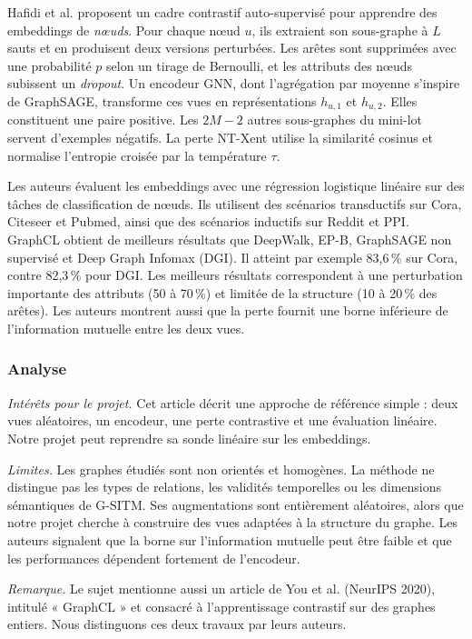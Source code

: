 \documentclass[11pt, french, screen, research-development]{report-rd-info}
\begin{document}
 Hafidi et al. \cite{hafidi2020graphcl} proposent un cadre contrastif auto-supervisé pour apprendre
des embeddings de \emph{nœuds}.
 Pour chaque nœud $u$, ils extraient son sous-graphe à $L$ sauts et en produisent deux versions
perturbées.
 Les arêtes sont supprimées avec une probabilité $p$ selon un tirage de Bernoulli, et les attributs
des nœuds subissent un \emph{dropout}.
 Un encodeur GNN, dont l'agrégation par moyenne s'inspire de GraphSAGE, transforme ces vues en
représentations $h_{u,1}$ et $h_{u,2}$.
 Elles constituent une paire positive. Les $2M-2$ autres sous-graphes du mini-lot servent d'exemples
négatifs.
 La perte NT-Xent utilise la similarité cosinus et normalise l'entropie croisée par la température
$\tau$.

 Les auteurs évaluent les embeddings avec une régression logistique linéaire sur des tâches de
classification de nœuds.
 Ils utilisent des scénarios transductifs sur Cora, Citeseer et Pubmed, ainsi que des scénarios
inductifs sur Reddit et PPI.
 GraphCL obtient de meilleurs résultats que DeepWalk, EP-B, GraphSAGE non supervisé et Deep Graph
Infomax (DGI).
Il atteint par exemple 83{,}6\,\% sur Cora, contre 82{,}3\,\% pour DGI. 
 Les meilleurs résultats correspondent à une perturbation importante des attributs (50 à 70\,\%) et
limitée de la structure (10 à 20\,\% des arêtes).
 Les auteurs montrent aussi que la perte fournit une borne inférieure de l'information mutuelle
entre les deux vues.

\subsubsection*{Analyse}

\emph{Intérêts pour le projet.}
 Cet article décrit une approche de référence simple : deux vues aléatoires, un encodeur, une perte
contrastive et une évaluation linéaire.
Notre projet peut reprendre sa sonde linéaire sur les embeddings.

\emph{Limites.}
 Les graphes étudiés sont non orientés et homogènes. La méthode ne distingue pas les types de
relations,
 les validités temporelles ou les dimensions sémantiques de G-SITM. Ses augmentations sont
entièrement aléatoires,
alors que notre projet cherche à construire des vues adaptées à la structure du graphe. 
 Les auteurs signalent que la borne sur l'information mutuelle peut être faible et que les
performances dépendent fortement de l'encodeur.

\emph{Remarque.}
 Le sujet mentionne aussi un article de You et al. (NeurIPS 2020), intitulé « GraphCL » et consacré
à l'apprentissage contrastif sur des graphes entiers.
Nous distinguons ces deux travaux par leurs auteurs.
\end{document}
